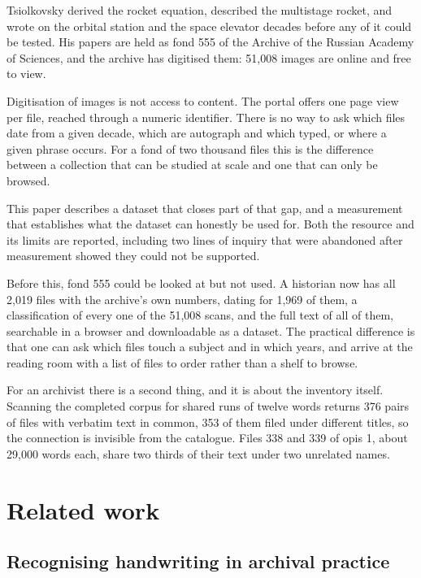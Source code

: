 \documentclass[11pt,a4paper]{article}
\begin{document}
Tsiolkovsky derived the rocket equation, described the multistage rocket, and
wrote on the orbital station and the space elevator decades before any of it
could be tested. His papers are held as fond 555 of the Archive of the Russian
Academy of Sciences, and the archive has digitised them: 51,008 images are
online and free to view.

Digitisation of images is not access to content. The portal offers one page
view per file, reached through a numeric identifier. There is no way to ask
which files date from a given decade, which are autograph and which typed, or
where a given phrase occurs. For a fond of two thousand files this is the
difference between a collection that can be studied at scale and one that can
only be browsed.

This paper describes a dataset that closes part of that gap, and a measurement
that establishes what the dataset can honestly be used for. Both the resource
and its limits are reported, including two lines of inquiry that were
abandoned after measurement showed they could not be supported.

Before this, fond 555 could be looked at but not used. A historian now has all
2,019 files with the archive's own numbers, dating for 1,969 of them, a
classification of every one of the 51,008 scans, and the full text of all of
them, searchable in a browser and downloadable as a dataset. The practical
difference is that one can ask which files touch a subject and in which years,
and arrive at the reading room with a list of files to order rather than a
shelf to browse.

For an archivist there is a second thing, and it is about the inventory
itself. Scanning the completed corpus for shared runs of twelve words returns
376 pairs of files with verbatim text in common, 353 of them filed under
different titles, so the connection is invisible from the catalogue. Files 338
and 339 of opis 1, about 29,000 words each, share two thirds of their text
under two unrelated names.

\section{Related work}\label{related-work}

\subsection{Recognising handwriting in archival practice}\label{recognising-handwriting-in-archival-practice}
\end{document}
